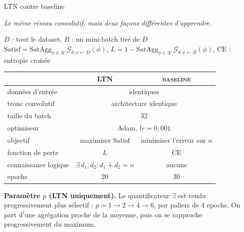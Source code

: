 \documentclass[aspectratio=169,10pt]{beamer}
\newcommand{\G}{\mathcal{G}}                      %
\newcommand{\KB}{\mathcal{K}}                     %
\newcommand{\SatAgg}{\mathrm{SatAgg}}
\begin{document}
\begin{frame}{LTN contre baseline}
  \scriptsize
  \begin{center}
    \footnotesize\itshape Le même réseau convolutif, mais deux façons
    différentes d'apprendre.
  \end{center}

  \begin{center}
    $D$ : tout le dataset, $B$ : un mini-batch tiré de $D$ \\[0.2em]
    $\text{Satisf} = \SatAgg_{\phi\in\KB}\,\G_{\theta,x\leftarrow D}(\phi)$,
    \quad $L = 1-\SatAgg_{\phi\in\KB}\,\G_{\theta,x\leftarrow B}(\phi)$,
    \quad $\text{CE}$ : entropie croisée
  \end{center}

  \renewcommand{\arraystretch}{1.0}
  \begin{center}
  \begin{tabular}{@{} l c c @{}}
    \toprule
    & {\color{accent}\scshape\footnotesize LTN} &
      {\color{ash}\scshape\footnotesize baseline} \\
    \midrule
    données d'entrée & \multicolumn{2}{c}{identiques} \\
    tronc convolutif & \multicolumn{2}{c}{architecture identique} \\
    taille du batch & \multicolumn{2}{c}{32} \\
    optimiseur & \multicolumn{2}{c}{Adam, $lr=0{,}001$} \\
    \midrule
    objectif & maximiser $\text{Satisf}$ &
      minimiser l'erreur sur $n$ \\
    fonction de perte & $L$ & $\text{CE}$ \\
    connaissance logique & $\exists\,d_1,d_2 : d_1+d_2=n$ & aucune \\
    \midrule
    epochs & 20 & 30 \\
    \bottomrule
  \end{tabular}
  \end{center}

  \vspace{0.3em}
  \textbf{Paramètre $p$ (LTN uniquement).} Le quantificateur $\exists$ est
  rendu progressivement plus sélectif : $p=1\rightarrow2\rightarrow4
  \rightarrow6$, par paliers de 4 epochs. On part d'une agrégation proche
  de la moyenne, puis on se rapproche progressivement du maximum.
\end{frame}
\end{document}
